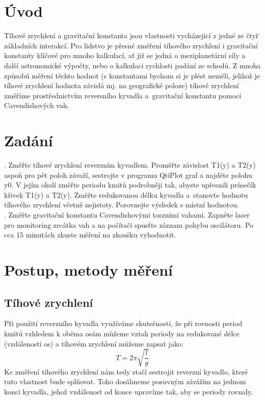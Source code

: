 \documentclass[czech,11pt,a4paper]{article}
\begin{document}
	\section{Úvod}
	Tíhové zrychlení a gravitační konstanta jsou vlastnosti vycházející z jedné ze čtyř základních interakcí. Pro lidstvo je přesné změření tíhového zrychlení i gravitační konstanty klíčové pro mnoho kalkulací, ať již se jedná o meziplanetární síly a další astronomické výpočty, nebo o kalkulaci rychlosti padání ze schodů. Z mnoha způsobů měření těchto hodnot (s konstantami bychom si je plést neměli, jelikož je tíhové zrychlení hodnota závislá mj. na geografické poloze) tíhové zrychlení změříme prostřednictvím reversního kyvadla a~gravitační konstantu pomocí Cavendishových vah.
	
	
	
	\section{Zadání}
	. Změřte tíhové zrychlení reverzním kyvadlem. Proměřte závislost T1(y) a T2(y) aspoň pro pět
	poloh závaží, sestrojte v programu QtiPlot graf a najděte polohu y0. V jejím okolí změřte periodu
	kmitů podrobněji tak, abyste upřesnili průsečík křivek T1(y) a T2(y). Změřte redukovanou délku
	kyvadla a~stanovte hodnotu tíhového zrychlení včetně nejistoty. Porovnejte výsledek s místní
	hodnotou.\\
	
	. Změřte gravitační konstantu Cavendishovými torzními vahami. Zapněte laser pro monitoring
	zrcátka vah a na počítači spusťte záznam pohybu oscilátoru. Po cca 15 minutách zkuste měření
	na zkoušku vyhodnotit. 
	
	
	\section{Postup, metody měření}
	\subsection{Tíhové zrychlení}
	Při použití reverzního kyvadla využíváme skutečnosti, že při rovnosti period kmitů vzhledem k oběma osám můžeme vztah periody na redukované délce (vzdálenosti os) a tíhovém zrychlení můžeme zapsat jako:
	\begin{equation}
		T = 2 \pi \sqrt{\frac l g}
	\end{equation}
	Ke změření tíhového zrychlení nám tedy stačí sestrojit reverzní kyvadlo, které tuto vlastnost bude splňovat. Toho dosáhneme posuvným závážím na jednom konci kyvadla, jehož vzdálenost od konce upravíme tak, aby se periody rovnaly. 
	
\end{document}
